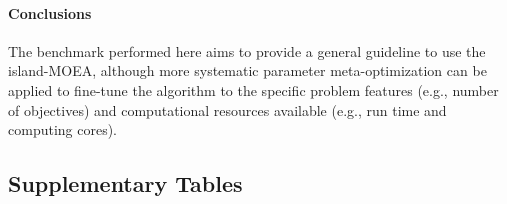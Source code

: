 


\paragraph{Conclusions}
The benchmark performed here aims to provide a general guideline to use the island-MOEA, although more systematic parameter meta-optimization can be applied to fine-tune the algorithm to the specific problem features (e.g., number of objectives) and computational resources available (e.g., run time and computing cores).

\subsection*{Supplementary Tables}

